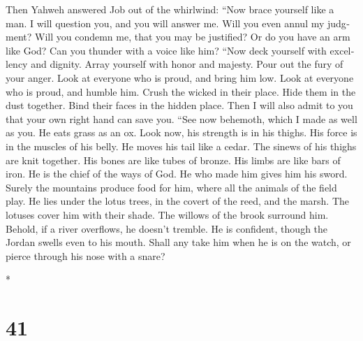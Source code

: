 \begin{paracol}{2}
\begin{otherlanguage}{english}
 Then Yahweh answered Job out of the whirlwind:
 ``Now brace yourself like a man. I will question you, and
you will answer me.  Will you even annul my judgment? Will
you condemn me, that you may be justified?  Or do you have
an arm like God? Can you thunder with a voice like him? 
``Now deck yourself with excellency and dignity. Array yourself with
honor and majesty.  Pour out the fury of your anger. Look
at everyone who is proud, and bring him low.  Look at
everyone who is proud, and humble him. Crush the wicked in their place.
 Hide them in the dust together. Bind their faces in the
hidden place.  Then I will also admit to you that your
own right hand can save you.  ``See now behemoth, which I
made as well as you. He eats grass as an ox.  Look now,
his strength is in his thighs. His force is in the muscles of his belly.
 He moves his tail like a cedar. The sinews of his thighs
are knit together.  His bones are like tubes of bronze.
His limbs are like bars of iron.  He is the chief of the
ways of God. He who made him gives him his sword.  Surely
the mountains produce food for him, where all the animals of the field
play.  He lies under the lotus trees, in the covert of
the reed, and the marsh.  The lotuses cover him with
their shade. The willows of the brook surround him. 
Behold, if a river overflows, he doesn't tremble. He is confident,
though the Jordan swells even to his mouth.  Shall any
take him when he is on the watch, or pierce through his nose with a
snare?

\end{otherlanguage}

\switchcolumn[0]*

\hypertarget{section-80}{%
\section{41}\label{section-80}}


\end{paracol}

